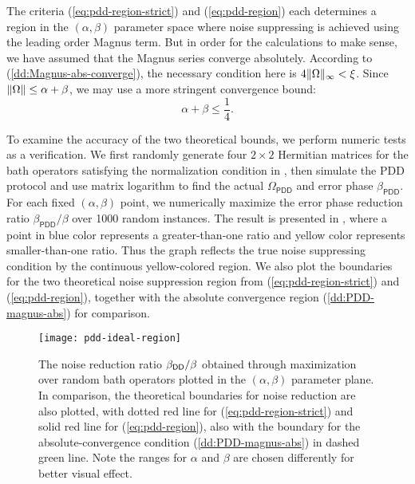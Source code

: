 \documentclass[pra,reprint,superscriptaddress]{revtex4-2}
\newcommand{\Opdd}{\Omega_{\mathsf{PDD}}}
\begin{document}
{The criteria (\ref{eq:pdd-region-strict}) and (\ref{eq:pdd-region}) each determines a region in the $(\alpha,\beta)$ parameter space where noise suppressing is achieved using the leading order Magnus term. 
But in order for the calculations to make sense, we have assumed that the Magnus series converge absolutely. According to (\ref{dd:Magnus-abs-converge}), the necessary condition here is $4 \Vert {\Omega} \Vert_\infty   < \xi$.
Since $\Vert {\Omega} \Vert \le \alpha +\beta$, we may use 
a more stringent convergence bound:
\begin{equation}\label{dd:PDD-magnus-abs}
    \alpha +\beta \le \frac{1}{4}.
\end{equation}

To examine the accuracy of the two theoretical bounds, we perform numeric tests as a verification. We first randomly generate  four $2\times 2$ Hermitian matrices for the bath operators satisfying the normalization condition in , then simulate the PDD protocol and use matrix logarithm to find the actual $\Opdd$ and error phase $\beta_\mathsf{PDD}$.  For each fixed $(\alpha,\beta)$ point, we numerically maximize the error phase reduction ratio $\beta_\mathsf{PDD}/\beta$ over 1000 random instances. The result is presented in , where a point in blue color represents a greater-than-one ratio and  yellow color represents smaller-than-one ratio. Thus the graph reflects the true noise suppressing condition by the continuous yellow-colored region.
We also plot the boundaries for the two theoretical noise suppression region from (\ref{eq:pdd-region-strict}) and (\ref{eq:pdd-region}), together with the absolute convergence region (\ref{dd:PDD-magnus-abs}) for comparison. 

\begin{figure}
\texttt{[image: pdd-ideal-region]}
\caption{The noise reduction ratio $\beta_{\mathsf{DD}}/\beta$ obtained through maximization over random bath operators plotted in the $(\alpha,\beta)$ parameter plane. In comparison, the theoretical boundaries for noise reduction are also plotted, with dotted red line for (\ref{eq:pdd-region-strict}) and solid red line for (\ref{eq:pdd-region}), also with the boundary for the absolute-convergence condition (\ref{dd:PDD-magnus-abs}) in dashed green line. Note the ranges for $\alpha$ and $\beta$ are chosen differently for better visual effect.}
\label{fig:pdd-region}
\end{figure}

}
\end{document}
